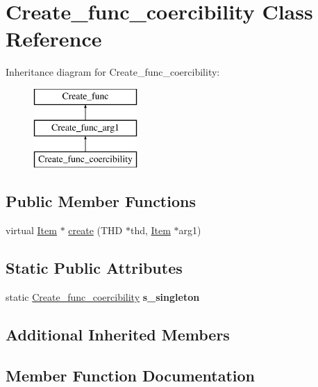 \hypertarget{classCreate__func__coercibility}{}\section{Create\+\_\+func\+\_\+coercibility Class Reference}
\label{classCreate__func__coercibility}
Inheritance diagram for Create\+\_\+func\+\_\+coercibility\+:\begin{figure}[H]
\begin{center}
\leavevmode
\includegraphics[height=3.000000cm]{classCreate__func__coercibility}
\end{center}
\end{figure}
\subsection*{Public Member Functions}
\begin{DoxyCompactItemize}
\item 
virtual \mbox{\hyperlink{classItem}{Item}} $\ast$ \mbox{\hyperlink{classCreate__func__coercibility_a8f0c63015e120f8dd079769bd0281b4a}{create}} (T\+HD $\ast$thd, \mbox{\hyperlink{classItem}{Item}} $\ast$arg1)
\end{DoxyCompactItemize}
\subsection*{Static Public Attributes}
\begin{DoxyCompactItemize}
\item 
\mbox{\label{classCreate__func__coercibility_aca846d88451aa0feb6275cd129492d76}} 
static \mbox{\hyperlink{classCreate__func__coercibility}{Create\+\_\+func\+\_\+coercibility}} {\bfseries s\+\_\+singleton}
\end{DoxyCompactItemize}
\subsection*{Additional Inherited Members}


\subsection{Member Function Documentation}
\mbox{\label{classCreate__func__coercibility_a8f0c63015e120f8dd079769bd0281b4a}} 

